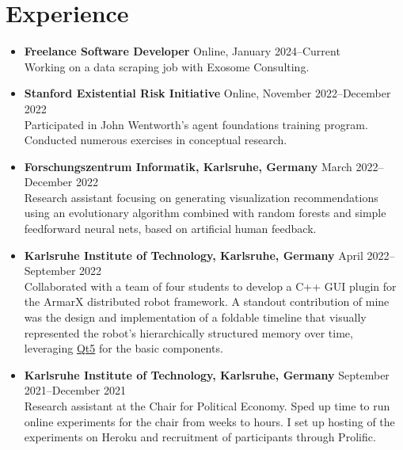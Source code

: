\documentclass[letterpaper,9pt]{article}
\begin{document}
\section{Experience}
\begin{itemize}
	\item \textbf{Freelance Software Developer} \hfill Online, January 2024--Current \\
        Working on a data scraping job with Exosome Consulting.
	\item \textbf{Stanford Existential Risk Initiative} \hfill Online, November 2022--December 2022 \\
		Participated in John Wentworth's agent foundations training program. Conducted numerous exercises in conceptual research.
	\item \textbf{Forschungszentrum Informatik, Karlsruhe, Germany} \hfill March 2022--December 2022 \\
	      Research assistant focusing on generating visualization recommendations using an
	      evolutionary algorithm combined with random forests and simple feedforward neural nets,
	      based on artificial human feedback.
	\item \textbf{Karlsruhe Institute of Technology, Karlsruhe, Germany} \hfill April 2022--September 2022 \\
	      Collaborated with a team of four students to develop a C++ GUI plugin for the
	      ArmarX distributed robot framework. A standout contribution of mine was the
	      design and implementation of a foldable timeline that visually represented the
	      robot's hierarchically structured memory over time,
	      leveraging \href{https://doc.qt.io/qt-5/}{Qt5} for the basic components.
	\item \textbf{Karlsruhe Institute of Technology, Karlsruhe, Germany} \hfill September 2021--December 2021 \\
	      Research assistant at the Chair for Political Economy. Sped up time to run online experiments for the chair from weeks to hours. I set up hosting of the experiments on Heroku and recruitment of participants through Prolific. %
\end{itemize}

\ifdefined\EAVersion
\end{document}
